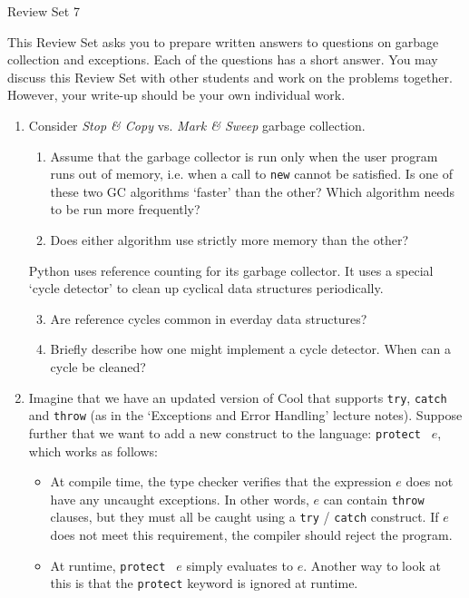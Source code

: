 \documentclass[12pt]{article} \usepackage{color} \usepackage{amsmath} \usepackage{amssymb}
\begin{document}
\begin{center}
{\large Review Set 7} 
\end{center}

This Review Set asks you to prepare written answers to questions on
garbage collection and exceptions. Each of the questions has
a short answer. You may discuss this Review Set with other students
and work on the problems together. However, your write-up should be
your own individual work.

\begin{enumerate}
\item{Consider \emph{Stop \&{} Copy} vs. \emph{Mark \&{} Sweep} garbage collection.
\begin{enumerate}
\item{Assume that the garbage collector is run only when the user
program runs out of memory, i.e. when a call to \texttt{new} cannot be
satisfied. Is one of these two GC algorithms `faster' than the other?
Which algorithm needs to be run more frequently?}
\item{Does either algorithm use strictly more memory than the other? \\}
\end{enumerate}


Python uses reference counting for its garbage collector. It uses a
special `cycle detector' to clean up cyclical data structures
periodically.
\begin{enumerate}
\setcounter{enumii}{2}
\item{Are reference cycles common in everday data structures?}
\item{Briefly describe how one might implement a cycle detector. When
can a cycle be cleaned?}
\end{enumerate}
}

\item{ Imagine that we have an updated version of Cool that supports
\texttt{try}, \texttt{catch} and \texttt{throw} (as in the `Exceptions
and Error Handling' lecture notes). Suppose further that we want to
add a new construct to the language: \texttt{protect } $e$, which
works as follows:

\begin{itemize}
\item{At compile time, the type checker verifies that the expression
$e$ does not have any uncaught exceptions. In other words, $e$ can
contain \texttt{throw} clauses, but they must all be caught using a
\texttt{try} / \texttt{catch} construct. If $e$ does not meet this
requirement, the compiler should reject the program.}
\item{At runtime, \texttt{protect } $e$ simply evaluates to
$e$. Another way to look at this is that the \texttt{protect} keyword
is ignored at runtime.}
\end{itemize}

}
\end{enumerate}
\end{document}
